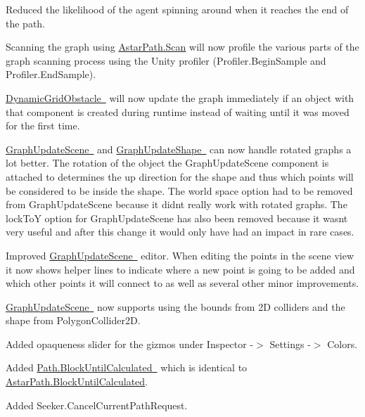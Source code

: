 \begin{DoxyItemize}
\begin{DoxyItemize}
\begin{DoxyItemize}
\begin{DoxyItemize}
\begin{DoxyItemize}
\item Reduced the likelihood of the agent spinning around when it reaches the end of the path.
\end{DoxyItemize}
\item Scanning the graph using \mbox{\hyperlink{class_astar_path_a9751550dc6954212dcb2e03aecafbcf6}{Astar\+Path.\+Scan}} will now profile the various parts of the graph scanning process using the Unity profiler (Profiler.\+Begin\+Sample and Profiler.\+End\+Sample).
\item \mbox{\hyperlink{class_pathfinding_1_1_dynamic_grid_obstacle}{Dynamic\+Grid\+Obstacle }} will now update the graph immediately if an object with that component is created during runtime instead of waiting until it was moved for the first time.
\item \mbox{\hyperlink{class_pathfinding_1_1_graph_update_scene}{Graph\+Update\+Scene }} and \mbox{\hyperlink{class_pathfinding_1_1_graph_update_shape}{Graph\+Update\+Shape }} can now handle rotated graphs a lot better. The rotation of the object the Graph\+Update\+Scene component is attached to determines the \textquotesingle{}up\textquotesingle{} direction for the shape and thus which points will be considered to be inside the shape. The world space option had to be removed from Graph\+Update\+Scene because it didn\textquotesingle{}t really work with rotated graphs. The lock\+ToY option for Graph\+Update\+Scene has also been removed because it wasn\textquotesingle{}t very useful and after this change it would only have had an impact in rare cases.
\item Improved \mbox{\hyperlink{class_pathfinding_1_1_graph_update_scene}{Graph\+Update\+Scene }} editor. When editing the points in the scene view it now shows helper lines to indicate where a new point is going to be added and which other points it will connect to as well as several other minor improvements. 
\item \mbox{\hyperlink{class_pathfinding_1_1_graph_update_scene}{Graph\+Update\+Scene }} now supports using the bounds from 2D colliders and the shape from Polygon\+Collider2D.
\item Added opaqueness slider for the gizmos under Inspector -\/$>$ Settings -\/$>$ Colors.
\item Added \mbox{\hyperlink{class_pathfinding_1_1_path_a7c90dc7a414ba9154785f8abda072d5d}{Path.\+Block\+Until\+Calculated }} which is identical to \mbox{\hyperlink{class_astar_path_a57ad57cd7356a7f9217516672e0a7bc9}{Astar\+Path.\+Block\+Until\+Calculated}}.
\item Added Seeker.\+Cancel\+Current\+Path\+Request.

\end{DoxyItemize}
\end{DoxyItemize}
\end{DoxyItemize}
\end{DoxyItemize}
